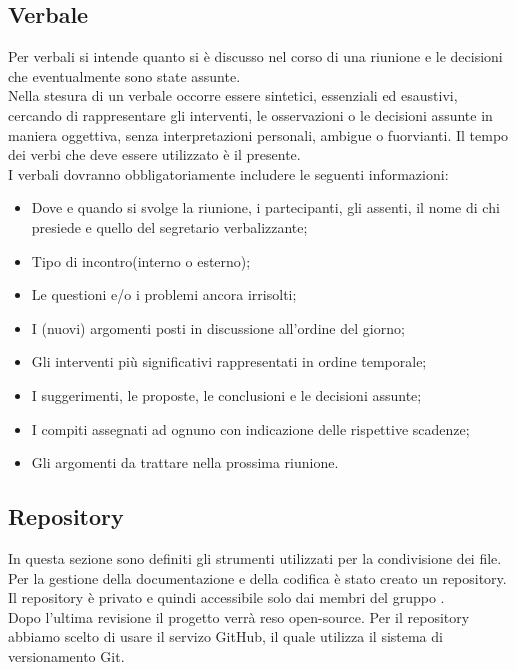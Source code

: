 	\subsection{Verbale}
Per verbali si intende quanto si è discusso nel corso di una riunione e le decisioni che eventualmente sono state assunte. \\
Nella stesura di un \gls{verbale} occorre essere sintetici, essenziali ed esaustivi, cercando di rappresentare gli interventi, le osservazioni o le decisioni assunte in maniera oggettiva, senza interpretazioni personali, ambigue o fuorvianti. Il tempo dei verbi che deve essere utilizzato è il presente.\\
I verbali dovranno obbligatoriamente includere le seguenti informazioni:
\begin{itemize}
	\item Dove e quando si svolge la riunione, i partecipanti, gli assenti, il nome di chi presiede e quello del segretario verbalizzante;
	\item Tipo di incontro(interno o esterno);
	\item Le questioni e/o i problemi ancora irrisolti;
	\item I (nuovi) argomenti posti in discussione all'ordine del giorno;
	\item Gli interventi più significativi rappresentati in ordine temporale; 
	\item I suggerimenti, le proposte, le conclusioni e le decisioni assunte; 
	\item I compiti assegnati ad ognuno con indicazione delle rispettive scadenze; 
	\item Gli argomenti da trattare nella prossima riunione. 
\end{itemize}

	\subsection{Repository}\label{repository}
In questa sezione sono definiti gli strumenti utilizzati per la condivisione dei file. \\
Per la gestione della documentazione e della codifica è stato creato un \gls{repository}. Il \gls{repository} è privato e quindi accessibile solo dai membri del gruppo \GRUPPO.\\
Dopo l'ultima revisione il progetto verrà reso open-source.
Per il \gls{repository} abbiamo scelto di usare il servizo \gls{GitHub}, il quale utilizza il sistema di \gls{versionamento} \gls{Git}.


